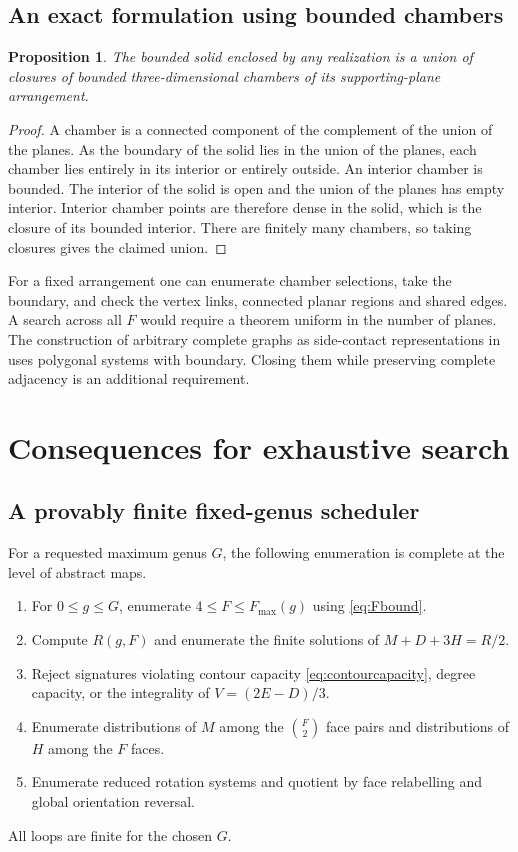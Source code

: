 \documentclass[11pt,a4paper]{article}
\newtheorem{proposition}[theorem]{Proposition}
\theoremstyle{definition}
\newcommand{\binomFtwo}{\binom{F}{2}}
\begin{document}
\subsection{An exact formulation using bounded chambers}

\begin{proposition}\label{prop:chambers}
The bounded solid enclosed by any realization is a union of closures of
bounded three-dimensional chambers of its supporting-plane arrangement.
\end{proposition}

\begin{proof}
A chamber is a connected component of the complement of the union of
the planes. As the boundary of the solid lies in the union of the planes,
each chamber lies entirely in its interior or entirely outside. An
interior chamber is bounded. The interior of the solid is open and the
union of the planes has empty interior. Interior chamber points are
therefore dense in the solid, which is the closure of its bounded
interior. There are finitely many chambers, so taking closures gives the
claimed union.
\end{proof}

For a fixed arrangement one can enumerate chamber selections, take the
boundary, and check the vertex links, connected planar regions and shared
edges. A search across all $F$ would require a theorem uniform in the
number of planes. The construction of arbitrary complete graphs as
side-contact representations in \cite{ArsenevaEtAl2024} uses polygonal
systems with boundary. Closing them while preserving complete adjacency
is an additional requirement.

\section{Consequences for exhaustive search}

\subsection{A provably finite fixed-genus scheduler}

For a requested maximum genus $G$, the following enumeration is complete at
the level of abstract maps.
\begin{enumerate}
\item For $0\leq g\leq G$, enumerate $4\leq F\leq F_{\max}(g)$ using
      \eqref{eq:Fbound}.
\item Compute $R(g,F)$ and enumerate the finite solutions of
      $M+D+3H=R/2$.
\item Reject signatures violating contour capacity
      \eqref{eq:contourcapacity}, degree capacity, or the integrality of
      $V=(2E-D)/3$.
\item Enumerate distributions of $M$ among the $\binomFtwo$ face pairs and
      distributions of $H$ among the $F$ faces.
\item Enumerate reduced rotation systems and quotient by face relabelling and
      global orientation reversal.
\end{enumerate}
All loops are finite for the chosen $G$.
\end{document}
